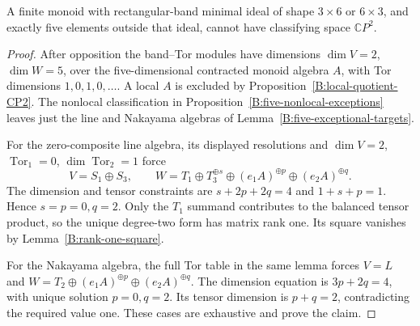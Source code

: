 \begin{lemma}
\label{C:three-by-six-five-outside-CP2}
A finite monoid with rectangular-band minimal ideal of shape
$3\times6$ or $6\times3$, and exactly five elements outside that
ideal, cannot have classifying space $\mathbb CP^2$.
\end{lemma}
\begin{proof}
After opposition the band--Tor modules have dimensions
$\dim V=2$, $\dim W=5$, over the five-dimensional contracted
monoid algebra $A$, with Tor dimensions $1,0,1,0,\ldots$.
A local $A$ is excluded by Proposition~\ref{B:local-quotient-CP2}.
The nonlocal classification in
Proposition~\ref{B:five-nonlocal-exceptions} leaves just the line
and Nakayama algebras of Lemma~\ref{B:five-exceptional-targets}.

For the zero-composite line algebra, its displayed resolutions
and $\dim V=2$, $\operatorname{Tor}_1=0$, $\dim\operatorname{Tor}_2=1$
force
\[
 V=S_1\oplus S_3,\qquad
 W=T_1\oplus T_3^{\oplus s}\oplus(e_1A)^{\oplus p}
                           \oplus(e_2A)^{\oplus q}.
\]
The dimension and tensor constraints are
$s+2p+2q=4$ and $1+s+p=1$.  Hence $s=p=0,q=2$.
Only the $T_1$ summand contributes to the balanced tensor product,
so the unique degree-two form has matrix rank one.  Its square
vanishes by Lemma~\ref{B:rank-one-square}.

For the Nakayama algebra, the full Tor table in the same lemma
forces $V=L$ and
$W=T_2\oplus(e_1A)^{\oplus p}\oplus(e_2A)^{\oplus q}$.
The dimension equation is $3p+2q=4$, with unique solution
$p=0,q=2$.  Its tensor dimension is $p+q=2$, contradicting the
required value one.  These cases are exhaustive and prove the claim.
\end{proof}

